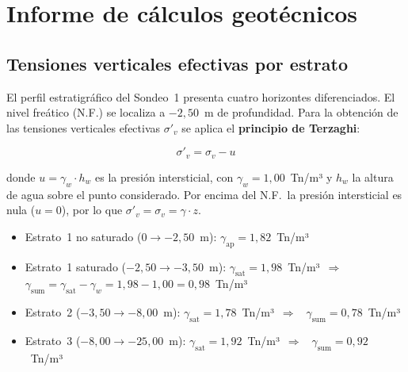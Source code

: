 \section{Informe de cálculos geotécnicos}
\label{sec:muro_geotecnia}

\subsection{Tensiones verticales efectivas por estrato}
\label{subsec:tensiones_verticales}

El perfil estratigráfico del Sondeo~1 presenta cuatro horizontes diferenciados.
El nivel freático (N.F.) se localiza a $-2{,}50$~m de profundidad. Para la
obtención de las tensiones verticales efectivas $\sigma'_v$ se aplica el
\textbf{principio de Terzaghi}:

\begin{equation}
  \sigma'_v = \sigma_v - u
  \label{eq:terzaghi}
\end{equation}

donde $u = \gamma_w \cdot h_w$ es la presión intersticial, con
$\gamma_w = 1{,}00$~Tn/m³ y $h_w$ la altura de agua sobre el punto considerado.
Por encima del N.F.\ la presión intersticial es nula ($u=0$), por lo que
$\sigma'_v = \sigma_v = \gamma \cdot z$.

\begin{supuestobox}
  \begin{itemize}
    \item Estrato~1 no saturado ($0 \to -2{,}50$~m):
          $\gamma_{\text{ap}} = 1{,}82$~Tn/m³
    \item Estrato~1 saturado ($-2{,}50 \to -3{,}50$~m):
          $\gamma_{\text{sat}} = 1{,}98$~Tn/m³~$\Rightarrow$~%
          $\gamma_{\text{sum}} = \gamma_{\text{sat}} - \gamma_w
           = 1{,}98 - 1{,}00 = 0{,}98$~Tn/m³
    \item Estrato~2 ($-3{,}50 \to -8{,}00$~m):
          $\gamma_{\text{sat}} = 1{,}78$~Tn/m³~$\Rightarrow$~%
          $\gamma_{\text{sum}} = 0{,}78$~Tn/m³
    \item Estrato~3 ($-8{,}00 \to -25{,}00$~m):
          $\gamma_{\text{sat}} = 1{,}92$~Tn/m³~$\Rightarrow$~%
          $\gamma_{\text{sum}} = 0{,}92$~Tn/m³
  \end{itemize}
\end{supuestobox}

